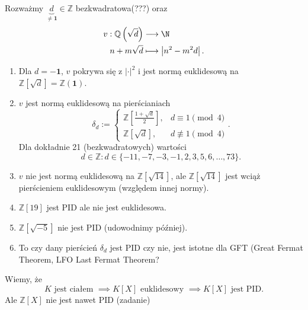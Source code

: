 \begin{remark}
	Rozważmy $\underbrace{d}_{\neq \mathbf{1}}\in \mathbb{Z} $ bezkwadratowa(???) oraz  \begin{align*}
		v: \mathbb{Q} \left( \sqrt{d}  \right)  &\longrightarrow \N \\
		n+m\sqrt{d}  &\longmapsto \left| n^2-m^2d \right|  
	.\end{align*}
	\begin{enumerate}[label=\arabic*)]
		\item Dla $d=-\mathbf{1}$, $v$ pokrywa się z $\left| \cdot  \right| ^2$ i jest normą euklidesową na $\mathbb{Z} \left[ \sqrt{d}  \right] = \mathbb{Z} \left( \mathbf{1} \right) $.
		\item $v$ jest normą euklidesową na pierścianiach
			\[
			\delta_{d}:= \begin{cases}
				\mathbb{Z} \left[ \frac{1+\sqrt{d} }{2} \right], &d \equiv 1 \pmod{4} \\
				\mathbb{Z} \left[ \sqrt{d}  \right], &d \not\equiv 1 \pmod{4} 
			\end{cases}
			.\] 
			Dla dokładnie 21 (bezkwadratowych) wartości \[d\in \mathbb{Z} : d\in \{-11,-7,-3,-1,2,3,5,6,\ldots,73\} .\]
		\item $v$ nie jest normą euklidesową na $\mathbb{Z} \left[ \sqrt{14}  \right] $, ale $\mathbb{Z} \left[ \sqrt{14}  \right] $ jest wciąż pierścieniem euklidesowym (względem innej normy).
		\item $\mathbb{Z} \left[ 19 \right] $ jest PID ale nie jest euklidesowa.
		\item $\mathbb{Z} \left[ \sqrt{-5}  \right] $ nie jest PID (udowodnimy później).
		\item To czy dany pierścień $\delta_{d}$ jest PID czy nie, jest istotne dla GFT (Great Fermat Theorem, LFO Last Fermat Theorem?
	\end{enumerate}
	Wiemy, że 
	\[
	K \text{ jest ciałem } \implies K\left[ X \right] \text{ euklidesowy } \implies K\left[ X \right] \text{ jest PID}
	.\] 
	Ale $\mathbb{Z} \left[ X \right] $ nie jest nawet PID (zadanie)
\end{remark} 
